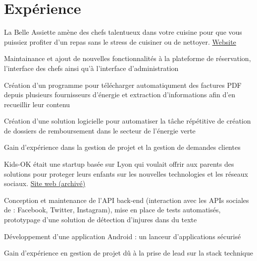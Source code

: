 \documentclass[
  french,
  a4paper
]{resume-openfont}
\begin{document}
\begin{minipage}[t]{0.66\textwidth}


\section{Expérience}
%
%
La Belle Assiette amène des chefs talentueux dans votre cuisine pour que vous puissiez profiter d'un repas sans le stress de cuisiner ou de nettoyer. \href{https://labelleassiette.co.uk}{Website}
\vspace{1.5\topsep} %
\begin{tightemize}
\item Maintainance et ajout de nouvelles fonctionnalités à la plateforme de réservation, l'interface des chefs ainsi qu'à l'interface d'administration
\end{tightemize}
\sectionsep

%
%
\vspace{1.5\topsep} %
\begin{tightemize}
\item Création d'un programme pour télécharger automatiqument des factures PDF depuis plusieurs fournisseurs d'énergie et extraction d'informations afin d'en recueillir leur contenu
\item Création d'une solution logicielle pour automatiser la tâche répétitive de création de dossiers de remboursement dans le secteur de l'énergie verte
\item Gain d'expérience dans la gestion de projet et la gestion de demandes clientes
\end{tightemize}
\sectionsep

%
%
Kids-OK était une startup basée sur Lyon qui voulait offrir aux parents des solutions pour proteger leurs enfants sur les nouvelles technologies et les réseaux sociaux. \href{https://i.imgur.com/ZAXWuZN.png}{Site web (archivé)}
\vspace{\topsep}
\begin{tightemize}
\item Conception et maintenance de l'API back-end (interaction avec les APIs sociales de : Facebook, Twitter, Instagram), mise en place de tests automatisés, prototypage d'une solution de détection d'injures dans du texte
\item Développement d'une application Android : un lanceur d'applications sécurisé
\item Gain d'expérience en gestion de projet dû à la prise de lead sur la stack technique
\end{tightemize}
\sectionsep


\end{minipage}
\end{document}
